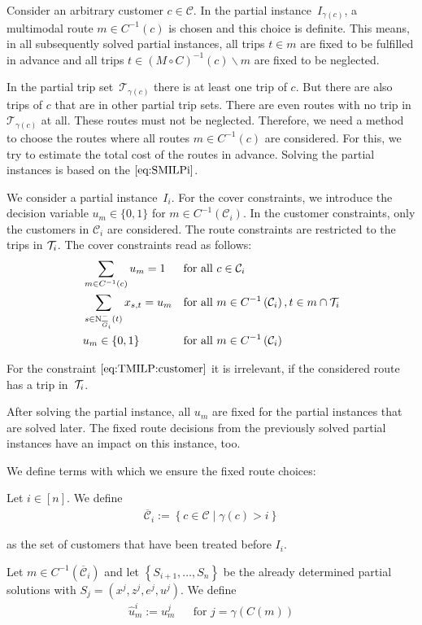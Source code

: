 Consider an arbitrary customer $c\in\mathcal{C}$. In the partial instance~$I_{\gamma(c)}$, a multimodal route $m\in C^{-1}(c)$ is chosen and this choice is definite. This means, in all subsequently solved partial instances, all trips ${t\in m}$ are fixed to be fulfilled in advance and all trips ${t\in(M\circ C)^{-1}(c)\backslash m}$ are fixed to be neglected.

In the partial trip set~$\mathcal{T}_{\gamma(c)}$ there is at least one trip of $c$. But there are also trips of $c$ that are in other partial trip sets. There are even routes with no trip in $\mathcal{T}_{\gamma(c)}$ at all. These routes must not be neglected. Therefore, we need a method to choose the routes where all routes ${m\in C^{-1}(c)}$ are considered. For this, we try to estimate the total cost of the routes in advance. Solving the partial instances is based on the $\eqref{eq:SMILPi}$.

We consider a partial instance~$I_i$. For the cover constraints, we introduce the decision variable ${u_m\in\{0,1\}}$ for ${m\in C^{-1}\left(\mathcal{C}_i\right)}$. In the customer constraints, only the customers in $\mathcal{C}_i$ are considered. The route constraints are restricted to the trips in $\mathcal{T}_i$. The cover constraints read as follows:
\begin{align}
	& \sum_{m\in C^{-1}(c)} u_m = 1 && \text{for all } c\in\mathcal{C}_i \label{eq:TMILP:customer} \\
	& \sum_{s\in\operatorname{N}_{\overline{G}_i}^-(t)} x_{s,t} = u_m && \text{for all } m\in C^{-1}\left(\mathcal{C}_i\right), t\in m\cap\mathcal{T}_i \label{eq:TMILP:route} \\
	& u_m\in\{0,1\} && \text{for all } m\in C^{-1}\left(\mathcal{C}_i\right) \label{eq:TMILP:um}
\end{align}

For the constraint $\eqref{eq:TMILP:customer}$ it is irrelevant, if the considered route has a trip in~$\mathcal{T}_i$.

After solving the partial instance, all $u_m$ are fixed for the partial instances that are solved later. The fixed route decisions from the previously solved partial instances have an impact on this instance, too. 

We define terms with which we ensure the fixed route choices:

\begin{definition}
\label{def:route_fix}

Let ${i\in[n]}$. We define
\begin{align*}
	\overline{\mathcal{C}}_i := \left\{c\in\mathcal{C}\mid \gamma\left(c\right)>i\right\}
\end{align*}

as the set of customers that have been treated before $I_i$.

Let ${m\in C^{-1}\left(\overline{\mathcal{C}}_i\right)}$ and let $\left\{S_{i+1},\dots,S_n\right\}$ be the already determined partial solutions with ${S_j=\left(x^j,z^j,e^j,u^j\right)}$. We define
\begin{align*}
	\hat{u}^i_m := u^j_m && \text{for } j=\gamma(C(m))
\end{align*}

\end{definition}

